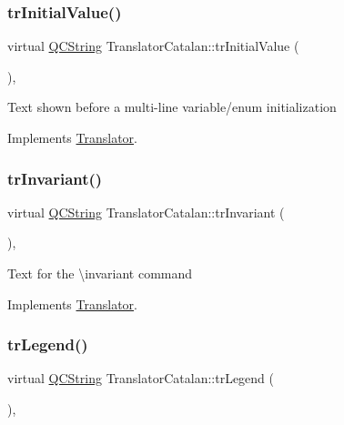 \subsubsection{\texorpdfstring{trInitialValue()}{trInitialValue()}}
{\footnotesize\ttfamily virtual \mbox{\hyperlink{class_q_c_string}{Q\+C\+String}} Translator\+Catalan\+::tr\+Initial\+Value (\begin{DoxyParamCaption}{ }\end{DoxyParamCaption})\hspace{0.3cm}{\ttfamily [inline]}, {\ttfamily [virtual]}}

Text shown before a multi-\/line variable/enum initialization 

Implements \mbox{\hyperlink{class_translator}{Translator}}.

\mbox{\label{class_translator_catalan_acdc84ca889585e59127b5760289a36db}} 
\subsubsection{\texorpdfstring{trInvariant()}{trInvariant()}}
{\footnotesize\ttfamily virtual \mbox{\hyperlink{class_q_c_string}{Q\+C\+String}} Translator\+Catalan\+::tr\+Invariant (\begin{DoxyParamCaption}{ }\end{DoxyParamCaption})\hspace{0.3cm}{\ttfamily [inline]}, {\ttfamily [virtual]}}

Text for the \textbackslash{}invariant command 

Implements \mbox{\hyperlink{class_translator}{Translator}}.

\mbox{\label{class_translator_catalan_a0edbf839459952f9b18aaaf37aa327cb}} 
\subsubsection{\texorpdfstring{trLegend()}{trLegend()}}
{\footnotesize\ttfamily virtual \mbox{\hyperlink{class_q_c_string}{Q\+C\+String}} Translator\+Catalan\+::tr\+Legend (\begin{DoxyParamCaption}{ }\end{DoxyParamCaption})\hspace{0.3cm}{\ttfamily [inline]}, {\ttfamily [virtual]}}

